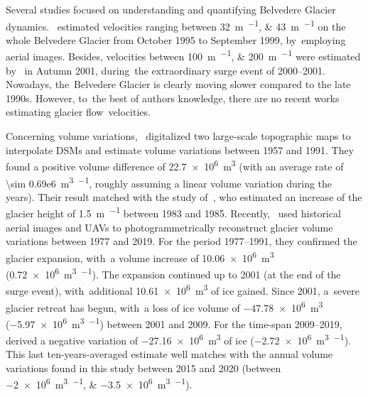 Several studies focused on understanding and quantifying Belvedere Glacier dynamics.~\cite{Kaab2005} estimated velocities ranging between \SIlist{32;43}{\meter\per\year} on the whole Belvedere Glacier from October 1995 to September 1999, by~employing aerial images.
Besides, velocities between \SIlist{100;200}{\meter\per\year} were estimated by~\cite{Kaab2005} in Autumn 2001, during~the extraordinary surge event of 2000--2001. 
Nowadays, the~Belvedere Glacier is clearly moving slower compared to the late 1990s. However, to~the best of authors knowledge, there are no recent works estimating glacier flow~velocities.

Concerning volume variations,~\cite{Diolaiuti2003} digitalized two large-scale topographic maps to interpolate DSMs and estimate volume variations between 1957 and 1991.
They found a positive volume difference of \SI[retain-explicit-plus]{+22.7e6}{\cubic\meter} (with an average rate of \SI{\sim 0.69e6}{\cubic\m\per\year}, roughly assuming a linear volume variation during the years).  
Their result matched with the study of~\cite{Roethlisberger1985}, who estimated an increase of the glacier height of \SI[retain-explicit-plus]{+1.5}{\m\per\year} between 1983 and 1985.
Recently,~\cite{Degaetani2021} used historical aerial images and UAVs to photogrammetrically reconstruct glacier volume variations between 1977 and 2019.
For the period \mbox{1977--1991}, they confirmed the glacier expansion, with~a volume increase of \SI[retain-explicit-plus]{+10.06e6}{\cubic\meter} (\SI[retain-explicit-plus]{+0.72e6}{\cubic\m\per\year}).
The expansion continued up to 2001 (at the end of the surge event), with~additional \SI{10.61e6}{\cubic\m} of ice gained.
Since 2001, a~severe glacier retreat has begun, with~a loss of ice volume of \SI{-47.78e6}{\cubic\meter} (\SI{-5.97e6}{\cubic\meter\per\year}) between 2001 and 2009.
For the time-span 2009--2019,~\cite{Degaetani2021} derived a negative variation of \SI{-27.16e6}{\cubic\m} of ice (\SI{-2.72e6}{\cubic\meter\per\year}). 
This last ten-years-averaged estimate well matches with the annual volume variations found in this study between 2015 and 2020 (between \SIlist{-2e6;-3.5e6}{\cubic\meter\per\year}).




